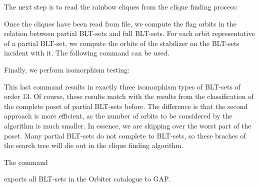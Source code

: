 
The next step is to read the rainbow cliques from the clique finding process:


Once the cliques have been read from file, 
we compute the flag orbits in the relation between partial BLT-sets and full BLT-sets.
For each orbit representative of a partial BLT-set, 
we compute the orbits of the stabilizer on the 
BLT-sets incident with it. The following command can be used.


Finally, we perform isomorphism testing:


This last command results in exactly three 
isomorphism types of BLT-sets of order 13.
Of course, these results match with the results 
from the classification of the complete poset of partial BLT-sets before.
The difference is that the second approach is more efficient, 
as the number of 
orbits to be considered by the algorithm is much smaller.
In essence, we are skipping over the worst part of the poset. 
Many partial BLT-sets do not complete to BLT-sets, 
so these braches of the search tree will die out in the clique finding algorithm.

\bigskip


The command 


exports all BLT-sets in the Orbiter catalogue to GAP. 


\bigskip

